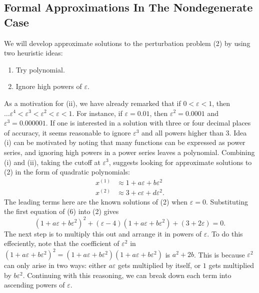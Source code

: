 \documentclass{article}
\theoremstyle{definition}
\theoremstyle{remark}
\theoremstyle{definition}
\begin{document}
\subsection{Formal Approximations In The Nondegenerate Case}
    We will develop approximate solutions to the perturbation problem (2) by using two heuristic ideas:
        \begin{enumerate}[label=(\roman*)]
            \item Try polynomial.
            \item Ignore high powers of $\varepsilon$.
        \end{enumerate}
    As a motivation for (ii), we have already remarked that if $0<\varepsilon<1$, then $\dots\varepsilon^4<\varepsilon^3<\varepsilon^2<\varepsilon<1$. For instance, if $\varepsilon=0.01$, then $\varepsilon^2=0.0001$ and $\varepsilon^3=0.000001$. If one is interested in a solution with three or four decimal places of accuracy, it seems reasonable to ignore $\varepsilon^3$ and all powers higher than 3. Idea (i) can be motivated by noting that many functions can be expressed as power series, and ignoring high powers in a power series leaves a polynomial. Combining (i) and (ii), taking the cutoff at $\varepsilon^3$, suggests looking for approximate solutions to (2) in the form of quadratic polynomials:
        \begin{equation}
            \begin{split}
                x^{(1)}&\approx 1+a\varepsilon+b\varepsilon^2 \\
                x^{(2)}&\approx 3+c\varepsilon+d\varepsilon^2.
            \end{split}
        \end{equation}
    \noindent The leading terms here are the known solutions of (2) when $\varepsilon=0$. Substituting the first equation of (6) into (2) gives
        \begin{equation*}
            (1+a\varepsilon+b\varepsilon^2)^2+(\varepsilon-4)(1+a\varepsilon+b\varepsilon^2)+(3+2\varepsilon)=0.
        \end{equation*}
    \noindent The next step is to multiply this out and arrange it in powers of $\varepsilon$. To do this effeciently, note that the coefficient of $\varepsilon^2$ in $(1+a\varepsilon+b\varepsilon^2)^2=(1+a\varepsilon+b\varepsilon^2)(1+a\varepsilon+b\varepsilon^2)$ is $a^2+2b$. This is because $\varepsilon^2$ can only arise in two ways: either $a\varepsilon$ gets multiplied by itself, or $1$ gets multiplied by $b\varepsilon^2$. Continuing with this reasoning, we can break down each term into ascending powers of $\varepsilon$.
\end{document}
